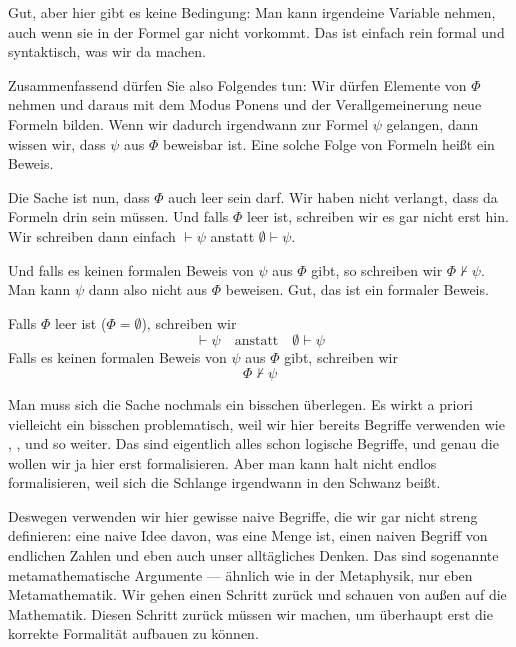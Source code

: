 \begin{spoken-clean}[00:28:22 - 00:31:22]
Gut, aber hier gibt es keine Bedingung: Man kann irgendeine Variable nehmen, auch wenn sie in der Formel gar nicht vorkommt. Das ist einfach rein formal und syntaktisch, was wir da machen. 

Zusammenfassend dürfen Sie also Folgendes tun: Wir dürfen Elemente von $\Phi$ nehmen und daraus mit dem Modus Ponens und der Verallgemeinerung neue Formeln bilden. Wenn wir dadurch irgendwann zur Formel $\psi$ gelangen, dann wissen wir, dass $\psi$ aus $\Phi$ beweisbar ist. Eine solche Folge von Formeln heißt ein Beweis.

Die Sache ist nun, dass $\Phi$ auch leer sein darf. Wir haben nicht verlangt, dass da Formeln drin sein müssen. Und falls $\Phi$ leer ist, schreiben wir es gar nicht erst hin. Wir schreiben dann einfach $\vdash \psi$ anstatt $\emptyset \vdash \psi$.

Und falls es keinen formalen Beweis von $\psi$ aus $\Phi$ gibt, so schreiben wir $\Phi \not\vdash \psi$. Man kann $\psi$ dann also nicht aus $\Phi$ beweisen. Gut, das ist ein formaler Beweis.
\end{spoken-clean}

\begin{math-stroke}
Falls $\Phi$ leer ist ($\Phi = \emptyset$), schreiben wir
\[
\vdash \psi \quad \text{anstatt} \quad \emptyset \vdash \psi
\]
Falls es keinen formalen Beweis von $\psi$ aus $\Phi$ gibt, schreiben wir
\[
\Phi \not\vdash \psi
\]
\end{math-stroke}

\begin{spoken-clean}[00:31:22 - 00:32:47]
Man muss sich die Sache nochmals ein bisschen überlegen. Es wirkt a priori vielleicht ein bisschen problematisch, weil wir hier bereits Begriffe verwenden wie , ,  und so weiter. Das sind eigentlich alles schon logische Begriffe, und genau die wollen wir ja hier erst formalisieren. Aber man kann halt nicht endlos formalisieren, weil sich die Schlange irgendwann in den Schwanz beißt. 

Deswegen verwenden wir hier gewisse naive Begriffe, die wir gar nicht streng definieren: eine naive Idee davon, was eine Menge ist, einen naiven Begriff von endlichen Zahlen und eben auch unser alltägliches Denken. Das sind sogenannte metamathematische Argumente --- ähnlich wie in der Metaphysik, nur eben Metamathematik. Wir gehen einen Schritt zurück und schauen von außen auf die Mathematik. Diesen Schritt zurück müssen wir machen, um überhaupt erst die korrekte Formalität aufbauen zu können.
\end{spoken-clean}

